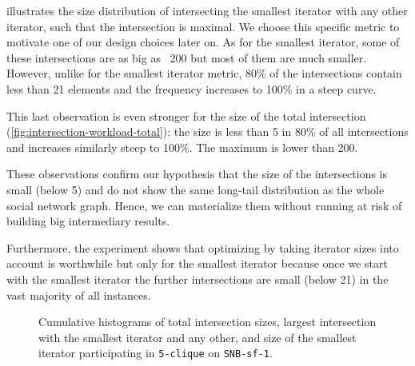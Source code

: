  illustrates the size distribution of intersecting the smallest iterator with any other
iterator, such that the intersection is maximal.
We choose this specific metric to motivate one of our design choices later on.
As for the smallest iterator, some of these intersections are as big as ~200 but most of them are much smaller.
However, unlike for the smallest iterator metric, 80\% of the intersections contain less than 21  elements and the frequency increases to
100\% in a steep curve.

This last observation is even stronger for the size of the total intersection (\cref{fig:intersection-workload-total}):
the size is less than 5 in 80\% of all intersections and increases similarly steep to 100\%.
The maximum is lower than 200.

These observations confirm our hypothesis that the size of the intersections is small (below 5) and do not show the same long-tail
distribution as the whole social network graph.
Hence, we can materialize them without running at risk of building big intermediary results.

Furthermore, the experiment shows that optimizing by taking iterator sizes into account is worthwhile but only for the smallest iterator
because
once we start with the smallest iterator the further intersections are small (below 21) in the vast majority of all instances.


\begin{figure}[H]
\centering
{}
\hfill
{}
\hfill
{}
\caption{Cumulative histograms of total intersection sizes, largest intersection with the smallest iterator and any other, and size of the
smallest iterator participating in \texttt{5-clique} on \texttt{SNB-sf-1}.}
\label{fig:intersection-workload}
\end{figure}

